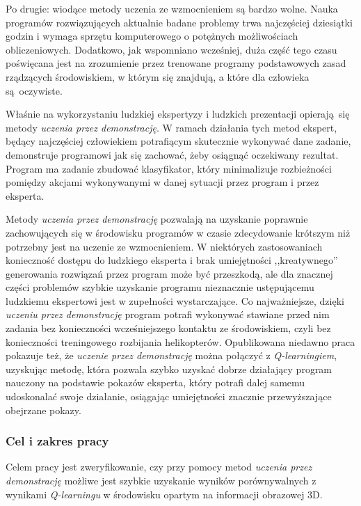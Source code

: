 Po drugie: wiodące metody uczenia ze wzmocnieniem są bardzo wolne. Nauka programów rozwiązujących aktualnie badane problemy trwa najczęściej dziesiątki godzin i wymaga sprzętu komputerowego o potężnych możliwościach obliczeniowych. Dodatkowo, jak wspomniano wcześniej, duża część tego czasu poświęcana jest na zrozumienie przez trenowane programy podstawowych zasad rządzących środowiskiem, w którym się znajdują, a które dla człowieka są oczywiste.

Właśnie na wykorzystaniu ludzkiej ekspertyzy i ludzkich prezentacji opierają się metody \textit{uczenia przez demonstrację}. W ramach działania tych metod ekspert, będący najczęściej człowiekiem potrafiącym skutecznie wykonywać dane zadanie, demonstruje programowi jak się zachować, żeby osiągnąć oczekiwany rezultat. Program ma zadanie zbudować klasyfikator, który minimalizuje rozbieżności pomiędzy akcjami wykonywanymi w danej sytuacji przez program i przez eksperta.

Metody \textit{uczenia przez demonstrację} pozwalają na uzyskanie poprawnie zachowujących się w środowisku programów w czasie zdecydowanie krótszym niż potrzebny jest na uczenie ze wzmocnieniem. W niektórych zastosowaniach konieczność dostępu do ludzkiego eksperta i brak umiejętności ,,kreatywnego'' generowania rozwiązań przez program może być przeszkodą, ale dla znacznej części problemów szybkie uzyskanie programu nieznacznie ustępującemu ludzkiemu ekspertowi jest w zupełności wystarczające. Co najważniejsze, dzięki \textit{uczeniu przez demonstrację} program potrafi wykonywać stawiane przed nim zadania bez konieczności wcześniejszego kontaktu ze środowiskiem, czyli bez konieczności treningowego rozbijania helikopterów. Opublikowana niedawno praca \cite{DBLP:journals/corr/HesterVPLSPSDOA17} pokazuje też, że \textit{uczenie przez demonstrację} można połączyć z \textit{Q-learningiem}, uzyskując metodę, która pozwala szybko uzyskać dobrze działający program nauczony na podstawie pokazów eksperta, który potrafi dalej samemu udoskonalać swoje działanie, osiągając umiejętności znacznie przewyższające obejrzane pokazy.


\subsubsection{Cel i zakres pracy}

Celem pracy jest zweryfikowanie, czy przy pomocy metod \textit{uczenia przez demonstrację} możliwe jest szybkie uzyskanie wyników porównywalnych z wynikami \textit {Q-learningu} w środowisku opartym na informacji obrazowej 3D.

